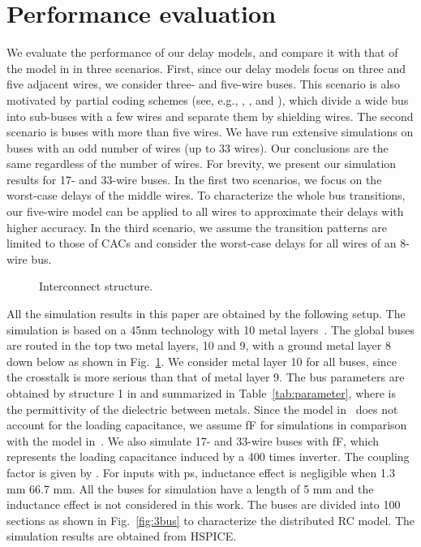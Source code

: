 \documentclass[10pt,journal]{IEEEtran}
\begin{document}
\section{Performance evaluation}\label{sec:simulation}
We evaluate the performance of our delay models, and compare it with that of the model in \cite{Sot01} in three scenarios. First, since our delay models focus on three and five adjacent wires, we consider three- and five-wire buses. This scenario is also motivated by partial coding schemes (see, e.g., \cite{Dua01}, \cite{Vic01}, and \cite{Sri07}), which divide a wide bus into sub-buses with a few wires and separate them by shielding wires.
The second scenario is buses with more than five wires. We have run extensive simulations on buses with an odd number of wires (up to 33 wires). Our conclusions are the same regardless of the number of wires. For brevity, we present our simulation results for 17- and 33-wire buses.
In the first two scenarios, we focus on the worst-case delays of the middle wires. To characterize the whole bus transitions, our five-wire model can be applied to all wires to approximate their delays with higher accuracy.
In the third scenario, we assume the transition patterns are limited to those of CACs and consider the worst-case delays for all wires of an 8-wire bus.


\begin{figure}[!tb]
\begin{minipage}[b]{1.0\linewidth}
  \centering
 \centerline{}
\end{minipage}
\caption{Interconnect structure.}
\label{fig:interconnect}
\end{figure}

All the simulation results in this paper are obtained by the following setup. The simulation is based on a 45nm technology with 10 metal layers~\cite{FreePDK45}. The global buses are routed in the top two metal layers, 10 and 9, with a ground metal layer 8 down below as shown in Fig.~\ref{fig:interconnect}.
We consider metal layer 10 for all buses, since the crosstalk is more serious than that of metal layer 9.
The bus parameters are obtained by structure 1 in \cite{PTM} and summarized in Table~\ref{tab:parameter}, where  is the permittivity of the dielectric between metals.
Since the model in~\cite{Sot01} does not account for the loading capacitance, we assume  fF for simulations in comparison with the model in~\cite{Sot01}. We also simulate 17- and 33-wire buses with  fF, which represents the loading capacitance induced by a 400 times inverter.
The coupling factor is given by .
For inputs with  ps, inductance effect is negligible when 1.3 mm  66.7 mm. All the buses for simulation have a length of 5 mm and the inductance effect is not considered in this work. The buses are divided into 100 sections as shown in Fig.~\ref{fig:3bus} to characterize the distributed RC model. The simulation results are obtained from HSPICE.
\end{document}
